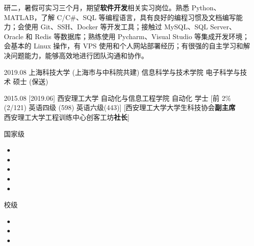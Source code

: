\documentclass[zh]{resume}
\begin{document}
\makeheader

{\onehalfspacing\hspace{2em}%
    研二，暑假可实习三个月，期望\textbf{软件开发}相关实习岗位。熟悉 Python、MATLAB，了解 C/C\#、SQL 等编程语言，具有良好的编程习惯及文档编写能力；会使用 Git、SSH、Docker 等开发工具；接触过 MySQL、SQL Server、Oracle 和 Redis 等数据库；熟练使用 Pycharm、Visual Studio 等集成开发环境；会基本的 Linux 操作，有 VPS 使用和个人网站部署经历；有很强的自主学习和解决问题能力，能够高效地进行团队沟通和协作。
    \par}

\begin{educations}
    \education%
    {2019.08}%
    {上海科技大学 (上海市与中科院共建) }%
    {信息科学与技术学院}%
    {电子科学与技术}%
    {硕士 (保送)}

    \separator{0.5ex}
    \education%
    {2015.08}%
    [2019.06]%
    {西安理工大学}%
    {自动化与信息工程学院}%
    {自动化}%
    {学士}
    [前 2\% (2/121) \textbullet 英语四级 (598) \textbullet 英语六级(443)]
    [西安理工大学大学生科技协会\textbf{副主席}\\
    西安理工大学工程训练中心创客工坊\textbf{社长}]
\end{educations}

\begin{awards}
    \award
    {国家级}
    {
        \begin{itemize}
            \item {}
            \item {}
            \item {}
            \item {}
            \item {}
        \end{itemize}
    }
    \separator{0.5ex}
    \award
    {校级}
    {
        \begin{itemize}
            \item {}
            \item {}
            \item {}
        \end{itemize}
    }
\end{awards}
\end{document}

